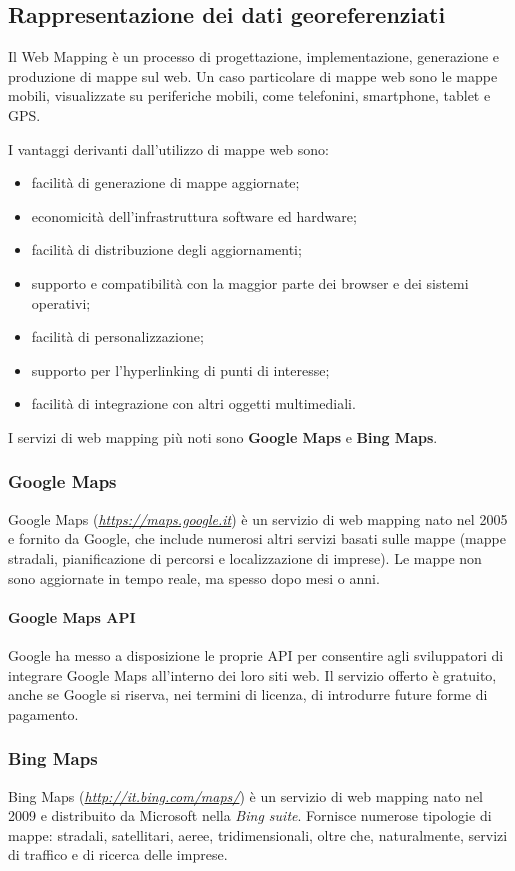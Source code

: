 \subsection{Rappresentazione dei dati georeferenziati}
Il Web Mapping è un processo di progettazione, implementazione, generazione e produzione di mappe sul web.
Un caso particolare di mappe web sono le mappe mobili, visualizzate su periferiche mobili, come telefonini, smartphone, tablet e GPS.

I vantaggi derivanti dall'utilizzo di mappe web sono:
\begin{itemize}
\item facilità di generazione di mappe aggiornate;
\item economicità dell'infrastruttura software ed hardware;
\item facilità di distribuzione degli aggiornamenti;
\item supporto e compatibilità con la maggior parte dei browser e dei sistemi operativi;
\item facilità di personalizzazione;
\item supporto per l'hyperlinking di punti di interesse;
\item facilità di integrazione con altri oggetti multimediali.
\end{itemize}

I servizi di web mapping più noti sono \textbf{Google Maps} e \textbf{Bing Maps}.
\subsubsection{Google Maps}
Google Maps (\emph{\url{https://maps.google.it}}) è un servizio di web mapping nato nel 2005 e fornito da Google, che include numerosi altri servizi basati sulle mappe (mappe stradali, pianificazione di percorsi e localizzazione di imprese).
Le mappe non sono aggiornate in tempo reale, ma spesso dopo mesi o anni.
\paragraph{Google Maps API}
Google ha messo a disposizione le proprie API per consentire agli sviluppatori di integrare Google Maps all'interno dei loro siti web.
Il servizio offerto è gratuito, anche se Google si riserva, nei termini di licenza, di introdurre future forme di pagamento.

\subsubsection{Bing Maps}
Bing Maps (\emph{\url{http://it.bing.com/maps/}}) è un servizio di web mapping nato nel 2009 e distribuito da Microsoft nella \textit{Bing suite}.
Fornisce numerose tipologie di mappe: stradali, satellitari, aeree, tridimensionali, oltre che, naturalmente, servizi di traffico e di ricerca delle imprese.
